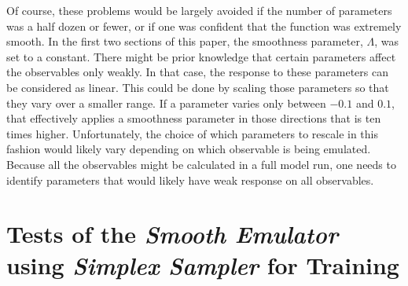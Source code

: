 \documentclass[UserManual.tex]{subfiles}
\begin{document}
Of course, these problems would be largely avoided if the number of parameters was a half dozen or fewer, or if one was confident that the function was extremely smooth. In the first two sections of this paper, the smoothness parameter, $\Lambda$, was set to a constant. There might be prior knowledge that certain parameters affect the observables only weakly. In that case, the response to these parameters can be considered as linear. This could be done by scaling those parameters so that they vary over a smaller range. If a parameter varies only between $-0.1$ and $0.1$, that effectively applies a smoothness parameter in those directions that is ten times higher. Unfortunately, the choice of which parameters to rescale in this fashion would likely vary depending on which observable is being emulated. Because all the observables might be calculated in a full model run, one needs to identify parameters that would likely have weak response on all observables. 

\section{Tests of the {\it Smooth Emulator} using {\it Simplex Sampler} for Training}
\end{document}

